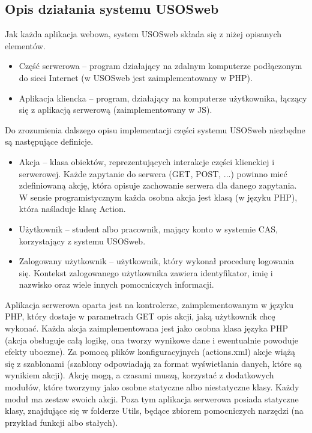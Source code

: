 \documentclass[licencjacka]{pracamgr}
\begin{document}
\subsection{Opis działania systemu USOSweb}
Jak każda aplikacja webowa, system USOSweb składa się z niżej opisanych elementów.
\begin{itemize}
  \item
  Część serwerowa -- program działający na zdalnym komputerze podłączonym do sieci Internet (w USOSweb jest zaimplementowany w PHP).
  \item
  Aplikacja kliencka -- program, działający na komputerze użytkownika, łączący się z aplikacją serwerową (zaimplementowany w JS).
\end{itemize}


Do zrozumienia dalszego opisu implementacji części systemu USOSweb niezbędne są następujące definicje.
\begin{itemize}
  \item
  Akcja -- klasa obiektów, reprezentujących interakcje części klienckiej i serwerowej. Każde zapytanie do serwera (GET, POST, ...) powinno mieć zdefiniowaną akcję, która opisuje zachowanie serwera dla danego zapytania. W sensie programistycznym każda osobna akcja jest klasą (w języku PHP), która naśladuje klasę Action.
  \item
  Użytkownik -- student albo pracownik, mający konto w systemie CAS, korzystający z systemu USOSweb.
  \item
  Zalogowany użytkownik -- użytkownik, który wykonał procedurę logowania się. Kontekst zalogowanego użytkownika zawiera identyfikator, imię i nazwisko oraz wiele innych pomocniczych informacji. 
\end{itemize}

Aplikacja serwerowa oparta jest na kontrolerze, zaimplementowanym w języku PHP, który dostaje w parametrach GET opis akcji, jaką użytkownik chcę wykonać. Każda akcja zaimplementowana jest jako osobna klasa języka PHP (akcja obsługuje całą logikę, ona tworzy wynikowe dane i ewentualnie powoduje efekty uboczne). Za pomocą plików konfiguracyjnych (actions.xml) akcje wiążą się z szablonami (szablony odpowiadają za format wyświetlania danych, które są wynikiem akcji). Akcję mogą, a czasami muszą, korzystać z dodatkowych modułów, które tworzymy jako osobne statyczne albo niestatyczne klasy. Każdy moduł ma zestaw swoich akcji. Poza tym aplikacja serwerowa posiada statyczne klasy, znajdujące się w folderze Utils, będące zbiorem pomocniczych narzędzi (na przykład funkcji albo stałych).
\end{document}
